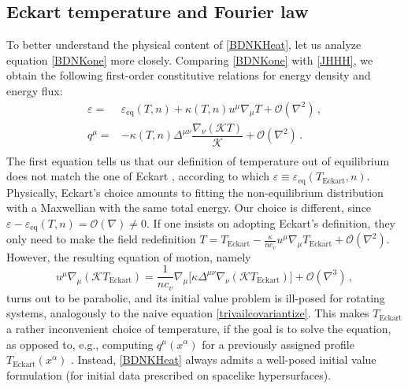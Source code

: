 \documentclass[a4paper, amsfonts, amssymb, amsmath, reprint, showkeys, nofootinbib, twoside, onecolumn,notitlepage]{revtex4-1}
\newcommand{\K}{{\mathcal{K}}}
\theoremstyle{definition}
\theoremstyle{theorem}
\begin{document}
\vspace{-0.2cm}
\subsection{Eckart temperature and Fourier law}
\vspace{-0.2cm}

To better understand the physical content of \eqref{BDNKHeat}, let us analyze equation \eqref{BDNKone} more closely. Comparing \eqref{BDNKone} with \eqref{JHHH}, we obtain the following first-order constitutive relations for energy density and energy flux:
\begin{equation}\label{ourframe}
\begin{split}
\varepsilon={}&\varepsilon_{\text{eq}}(T,n)+\kappa(T,n) u^\mu \nabla_\mu T +\mathcal{O}(\nabla^2) \, , \\
q^\mu ={}& -\kappa(T,n) \Delta^{\mu \nu } \dfrac{\nabla_\nu (\K T)}{\K} +\mathcal{O}(\nabla^2) \, . \\
\end{split}
\end{equation}
The first equation tells us that our definition of temperature out of equilibrium does not match the one of Eckart \cite{Eckart40}, according to which $\varepsilon\equiv \varepsilon_\text{eq}(T_{\text{Eckart}},n)$. Physically, Eckart's choice amounts to fitting the non-equilibrium distribution with a Maxwellian with the same total energy. Our choice is different, since $\varepsilon-\varepsilon_{\text{eq}}(T,n)=\mathcal{O}(\nabla)\neq 0$. If one insists on adopting Eckart's definition, they only need to make the field redefinition $T=T_{\text{Eckart}}-\frac{\kappa}{nc_v}u^\mu \nabla_\mu T_{\text{Eckart}}+\mathcal{O}(\nabla^2)$. However, the resulting equation of motion, namely
\begin{equation}\label{eckartone}
u^\mu \nabla_\mu (\K T_{\text{Eckart}})=\dfrac{1}{nc_v} \nabla_\mu \big[\kappa \Delta^{\mu \nu}\nabla_\nu (\K T_{\text{Eckart}}) \big] +\mathcal{O}(\nabla^3) \, ,
\end{equation}
turns out to be parabolic, and its initial value problem is ill-posed for rotating systems, analogously to the naive equation \eqref{trivailcovariantize}. This makes $T_{\text{Eckart}}$ a rather inconvenient choice of temperature, if the goal is to solve the equation, as opposed to, e.g., computing $q^\mu (x^\alpha)$ for a previously assigned profile $T_{\text{Eckart}}(x^\alpha)$ \cite{Geroch95}. Instead, \eqref{BDNKHeat} always admits a well-posed initial value formulation (for initial data prescribed on spacelike hypersurfaces).
\end{document}
